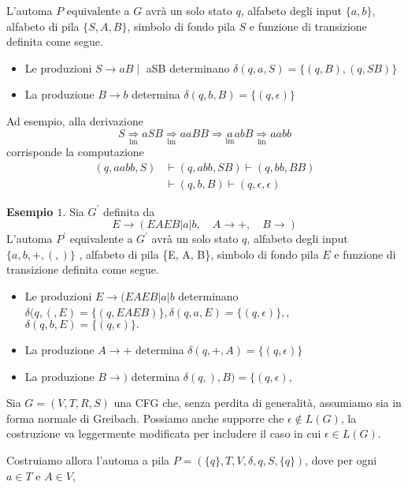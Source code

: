L'automa $P$ equivalente a $G$ avrà un solo stato $q$, alfabeto degli input $\{a, b\}$, alfabeto di pila $\{S, A, B\}$, simbolo di fondo pila $S$ e funzione di transizione definita come segue.
\begin{itemize}
    \item Le produzioni $S \rightarrow a B \mid$ aSB determinano $\delta(q, a, S)=\{(q, B),(q, S B)\}$
    \item  La produzione $B \rightarrow b$ determina $\delta(q, b, B)=\{(q, \epsilon)\}$
\end{itemize}
Ad esempio, alla derivazione
$$
S \underset{\operatorname{lm}}{\Rightarrow} a S B \underset{\operatorname{lm}}{\Rightarrow} a a B B \Rightarrow \underset{\operatorname{lm}}{a} a b B \underset{\operatorname{lm}}{\Rightarrow} a a b b
$$
corrisponde la computazione
$$
\begin{aligned}
(q, a a b b, S) & \vdash(q, a b b, S B) \vdash(q, b b, B B) \\
& \vdash(q, b, B) \vdash(q, \epsilon, \epsilon)
\end{aligned}
$$

\vspace{5mm}

\textbf{Esempio $1 .$}
Sia $G^{\prime}$ definita da
$$
E \rightarrow(E A E B|a| b, \quad A \rightarrow+, \quad B \rightarrow)
$$
L'automa $P^{\prime}$ equivalente a $G^{\prime}$ avrà un solo stato $q$, alfabeto degli input $\{a, b,+,(,)\}$ , alfabeto di pila \{E, A, B\}, simbolo di fondo pila $E$ e funzione di transizione definita come segue.
\begin{itemize}
    \item Le produzioni $E \rightarrow(E A E B|a| b$ determinano $\delta(q,(, E)=\{(q, E A E B)\}, \delta(q, a, E)=\{(q, \epsilon)\},$, $\delta(q, b, E)=\{(q, \epsilon)\} .$
    \item La produzione $A \rightarrow+$ determina $\delta(q,+, A)=\{(q, \epsilon)\}$
    \item La produzione $B \rightarrow)$ determina $\delta(q,), B)=\{(q, \epsilon)$,
\end{itemize}

Sia $G=(V, T, R, S)$ una CFG che, senza perdita di generalità, assumiamo sia in forma normale di Greibach. Possiamo anche supporre che $\epsilon \notin L(G)$, la costruzione va leggermente modificata per includere il caso in cui $\epsilon \in L(G)$.

Costruiamo allora l'automa a pila
$P=(\{q\}, T, V, \delta, q, S,\{q\})$, dove per ogni $a \in T$ e $A \in V$,

